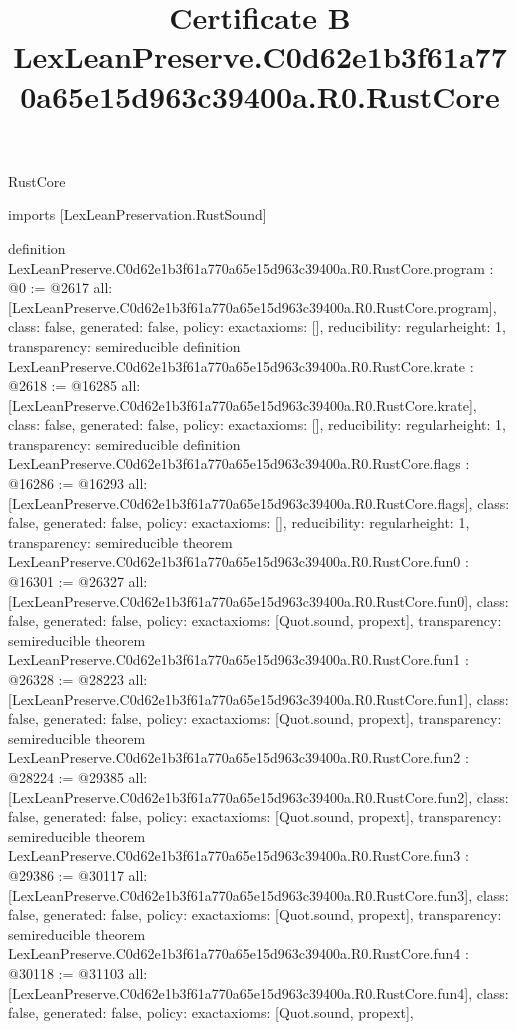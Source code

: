 \begin{lexlean}{RustCore}
\title{Certificate B LexLeanPreserve.C0d62e1b3f61a770a65e15d963c39400a.R0.RustCore}
\begin{coremodule}
imports [LexLeanPreservation.RustSound]

definition LexLeanPreserve.C0d62e1b3f61a770a65e15d963c39400a.R0.RustCore.program : @0 := @2617 {
  all: [LexLeanPreserve.C0d62e1b3f61a770a65e15d963c39400a.R0.RustCore.program],
  class: false,
  generated: false,
  policy: exact{axioms: []},
  reducibility: regular{height: 1},
  transparency: semireducible
}
definition LexLeanPreserve.C0d62e1b3f61a770a65e15d963c39400a.R0.RustCore.krate : @2618 := @16285 {
  all: [LexLeanPreserve.C0d62e1b3f61a770a65e15d963c39400a.R0.RustCore.krate],
  class: false,
  generated: false,
  policy: exact{axioms: []},
  reducibility: regular{height: 1},
  transparency: semireducible
}
definition LexLeanPreserve.C0d62e1b3f61a770a65e15d963c39400a.R0.RustCore.flags : @16286 := @16293 {
  all: [LexLeanPreserve.C0d62e1b3f61a770a65e15d963c39400a.R0.RustCore.flags],
  class: false,
  generated: false,
  policy: exact{axioms: []},
  reducibility: regular{height: 1},
  transparency: semireducible
}
theorem LexLeanPreserve.C0d62e1b3f61a770a65e15d963c39400a.R0.RustCore.fun0 : @16301 := @26327 {
  all: [LexLeanPreserve.C0d62e1b3f61a770a65e15d963c39400a.R0.RustCore.fun0],
  class: false,
  generated: false,
  policy: exact{axioms: [Quot.sound, propext]},
  transparency: semireducible
}
theorem LexLeanPreserve.C0d62e1b3f61a770a65e15d963c39400a.R0.RustCore.fun1 : @26328 := @28223 {
  all: [LexLeanPreserve.C0d62e1b3f61a770a65e15d963c39400a.R0.RustCore.fun1],
  class: false,
  generated: false,
  policy: exact{axioms: [Quot.sound, propext]},
  transparency: semireducible
}
theorem LexLeanPreserve.C0d62e1b3f61a770a65e15d963c39400a.R0.RustCore.fun2 : @28224 := @29385 {
  all: [LexLeanPreserve.C0d62e1b3f61a770a65e15d963c39400a.R0.RustCore.fun2],
  class: false,
  generated: false,
  policy: exact{axioms: [Quot.sound, propext]},
  transparency: semireducible
}
theorem LexLeanPreserve.C0d62e1b3f61a770a65e15d963c39400a.R0.RustCore.fun3 : @29386 := @30117 {
  all: [LexLeanPreserve.C0d62e1b3f61a770a65e15d963c39400a.R0.RustCore.fun3],
  class: false,
  generated: false,
  policy: exact{axioms: [Quot.sound, propext]},
  transparency: semireducible
}
theorem LexLeanPreserve.C0d62e1b3f61a770a65e15d963c39400a.R0.RustCore.fun4 : @30118 := @31103 {
  all: [LexLeanPreserve.C0d62e1b3f61a770a65e15d963c39400a.R0.RustCore.fun4],
  class: false,
  generated: false,
  policy: exact{axioms: [Quot.sound, propext]},
}
\end{coremodule}
\end{lexlean}
